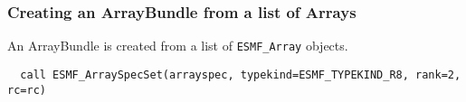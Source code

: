  
\setlength{\oldparskip}{\parskip}
\setlength{\parskip}{1.5ex}
\setlength{\oldparindent}{\parindent}
\setlength{\parindent}{0pt}
\setlength{\oldbaselineskip}{\baselineskip}
\setlength{\baselineskip}{11pt}
 
\def\bv{\begin{verbatim}}
\def\ev{\end{verbatim}}
\def\be{\begin{equation}}
\def\ee{\end{equation}}
\def\bea{\begin{eqnarray}}
\def\eea{\end{eqnarray}}
\def\bi{\begin{itemize}}
\def\ei{\end{itemize}}
\def\bn{\begin{enumerate}}
\def\en{\end{enumerate}}
\def\bd{\begin{description}}
\def\ed{\end{description}}
\def\({\left (}
\def\){\right )}
\def\[{\left [}
\def\]{\right ]}
\def\<{\left  \langle}
\def\>{\right \rangle}
\def\cI{{\cal I}}
\def\diag{\mathop{\rm diag}}
\def\tr{\mathop{\rm tr}}


 

   \subsubsection{Creating an ArrayBundle from a list of Arrays}
  
   An ArrayBundle is created from a list of {\tt ESMF\_Array} objects. 

 \begin{verbatim}
  call ESMF_ArraySpecSet(arrayspec, typekind=ESMF_TYPEKIND_R8, rank=2, rc=rc)
 
\end{verbatim}
 
